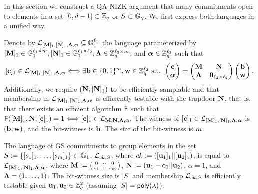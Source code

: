 
In this section we construct a QA-NIZK argument that many commitments open to elements in a set $[0,d-1] \subset \mathbb{Z}_q$ or  $S \subset \mathbb{G}_{\gamma}$. We first express both languages in a unified way. 


\begin{definition}
Denote by $\mathcal{L}_{[\mathbf{{M}}]_1,[\mathbf{{N}}]_1,\mathbf{{\Lambda}},{\boldsymbol \alpha}}\subseteq\mathbb{G}_1^{\ell_1}$ the language parameterized by $[\mathbf{{M}}]_1 \in\mathbb{G}_1^{{\ell_1}\times {m}},[\mathbf{{N}}]_1\in\mathbb{G}_1^{{\ell_1}\times {\ell_2}},\mathbf{{\Lambda}}\in\mathbb{Z}_q^{{\ell_3}\times{m}},$ and ${\boldsymbol \alpha}\in\mathbb{Z}_q^{\ell_3}$ such that
\begin{equation}\label{eq:definition1}
[\mathbf{c}]_1\in\mathcal{L}_{[\mathbf{{M}}]_1,[\mathbf{{N}}]_1,\mathbf{{\Lambda}},{\boldsymbol \alpha}} \Longleftrightarrow \exists \mathbf{b}\in\{0,1\}^{m},\mathbf{w}\in\mathbb{Z}_q^{\ell_2} \text{ s.t. }
\left(\begin{matrix}
    \mathbf{c}\\
    {\boldsymbol \alpha}
\end{matrix}\right)
=
\begin{pmatrix}
    \mathbf{{M}}       & \mathbf{{N}}\\
    \mathbf{{\Lambda}} & \mathbf{{0}}_{{\ell_3}\times {\ell_2}}
\end{pmatrix}
\left(\begin{matrix}
    \mathbf{b}\\
    \mathbf{w}
\end{matrix}\right).
\end{equation}
Additionally, we require $(\mathbf{{N}},[\mathbf{{N}}]_1)$ to be efficiently samplable and that membership in $\mathcal{L}_{[\mathbf{{M}}]_1,[\mathbf{{N}}]_1,\mathbf{{\Lambda}},{\boldsymbol \alpha}}$ is efficiently testable with the trapdoor $\mathbf{{N}}$, that is, that there exists an efficient algorithm $\mathsf{F}$ such that $\mathsf{F}([\mathbf{{M}}]_1,\mathbf{{N}},[\mathbf{c}]_1)=1\Longleftrightarrow [\mathbf{c}]_1\in\mathcal{L}_{\mathbf{{M}},\mathbf{{N}},\mathbf{{\Lambda}},{\boldsymbol \alpha}}.$ The witness of 
$[\mathbf{c}]_1\in\mathcal{L}_{[\mathbf{{M}}]_1,[\mathbf{{N}}]_1,\mathbf{{\Lambda}},{\boldsymbol \alpha}}$ is $(\mathbf{b},\mathbf{w})$, and the bit-witness is $\mathbf{b}$. The size of the bit-witness is ${m}$. 
\end{definition}

\begin{example}
The language of GS commitments to group elements in the set $S:=\{[s_1]_1,\ldots,[s_{m}]_1\} \subset \mathbb{G}_1$, $\mathcal{L}_{ck,S}$, where $ck:=([\mathbf{u}_1]_1||[\mathbf{u}_2]_1)$, is equal to $\mathcal{L}_{[\mathbf{{M}}]_1,[\mathbf{{N}}]_1,\mathbf{{\Lambda}},{\boldsymbol \alpha}}$, where
$\mathbf{{M}}:=\left(\begin{smallmatrix}0 &\cdots & 0\\s_1 & \cdots & s_{m}\end{smallmatrix}\right)$, $\mathbf{{N}}:=(\mathbf{u}_1-\mathbf{e}_1||\mathbf{u}_2)$, $\alpha=1$, and $\mathbf{{\Lambda}}=(1,\ldots,1)$. The bit-witness size is $|S|$ and membership $\mathcal{L}_{ck,S}$ is efficiently testable given $\mathbf{u}_1,\mathbf{u}_2 \in \mathbb{Z}_q^2$ (assuming $|S|=\mathsf{poly}(\lambda)$). 
\end{example}

